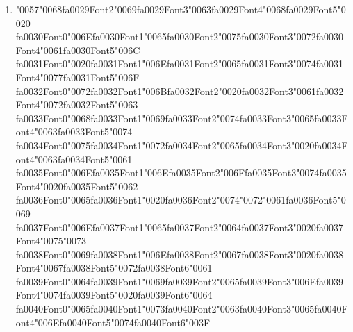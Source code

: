 \documentclass[12pt]{article}
\begin{document}
\begin{enumerate}[label=Q\arabic*.]
\item {\char"0057}{\char"0068}{\csname fa0029Font2\endcsname\char"0069}{\csname fa0029Font3\endcsname\char"0063}{\csname fa0029Font4\endcsname\char"0068}{\csname fa0029Font5\endcsname\char"0020} {\csname fa0030Font0\endcsname\char"006E}{\csname fa0030Font1\endcsname\char"0065}{\csname fa0030Font2\endcsname\char"0075}{\csname fa0030Font3\endcsname\char"0072}{\csname fa0030Font4\endcsname\char"0061}{\csname fa0030Font5\endcsname\char"006C} {\csname fa0031Font0\endcsname\char"0020}{\csname fa0031Font1\endcsname\char"006E}{\csname fa0031Font2\endcsname\char"0065}{\csname fa0031Font3\endcsname\char"0074}{\csname fa0031Font4\endcsname\char"0077}{\csname fa0031Font5\endcsname\char"006F} {\csname fa0032Font0\endcsname\char"0072}{\csname fa0032Font1\endcsname\char"006B}{\csname fa0032Font2\endcsname\char"0020}{\csname fa0032Font3\endcsname\char"0061}{\csname fa0032Font4\endcsname\char"0072}{\csname fa0032Font5\endcsname\char"0063} {\csname fa0033Font0\endcsname\char"0068}{\csname fa0033Font1\endcsname\char"0069}{\csname fa0033Font2\endcsname\char"0074}{\csname fa0033Font3\endcsname\char"0065}{\csname fa0033Font4\endcsname\char"0063}{\csname fa0033Font5\endcsname\char"0074} {\csname fa0034Font0\endcsname\char"0075}{\csname fa0034Font1\endcsname\char"0072}{\csname fa0034Font2\endcsname\char"0065}{\csname fa0034Font3\endcsname\char"0020}{\csname fa0034Font4\endcsname\char"0063}{\csname fa0034Font5\endcsname\char"0061} {\csname fa0035Font0\endcsname\char"006E}{\csname fa0035Font1\endcsname\char"006E}{\csname fa0035Font2\endcsname\char"006F}{\csname fa0035Font3\endcsname\char"0074}{\csname fa0035Font4\endcsname\char"0020}{\csname fa0035Font5\endcsname\char"0062} {\csname fa0036Font0\endcsname\char"0065}{\csname fa0036Font1\endcsname\char"0020}{\csname fa0036Font2\endcsname\char"0074}{\char"0072}{\char"0061}{\csname fa0036Font5\endcsname\char"0069} {\csname fa0037Font0\endcsname\char"006E}{\csname fa0037Font1\endcsname\char"0065}{\csname fa0037Font2\endcsname\char"0064}{\csname fa0037Font3\endcsname\char"0020}{\csname fa0037Font4\endcsname\char"0075}{\char"0073} {\csname fa0038Font0\endcsname\char"0069}{\csname fa0038Font1\endcsname\char"006E}{\csname fa0038Font2\endcsname\char"0067}{\csname fa0038Font3\endcsname\char"0020}{\csname fa0038Font4\endcsname\char"0067}{\csname fa0038Font5\endcsname\char"0072}{\csname fa0038Font6\endcsname\char"0061} {\csname fa0039Font0\endcsname\char"0064}{\csname fa0039Font1\endcsname\char"0069}{\csname fa0039Font2\endcsname\char"0065}{\csname fa0039Font3\endcsname\char"006E}{\csname fa0039Font4\endcsname\char"0074}{\csname fa0039Font5\endcsname\char"0020}{\csname fa0039Font6\endcsname\char"0064} {\csname fa0040Font0\endcsname\char"0065}{\csname fa0040Font1\endcsname\char"0073}{\csname fa0040Font2\endcsname\char"0063}{\csname fa0040Font3\endcsname\char"0065}{\csname fa0040Font4\endcsname\char"006E}{\csname fa0040Font5\endcsname\char"0074}{\csname fa0040Font6\endcsname\char"003F}

\end{enumerate}
\end{document}
